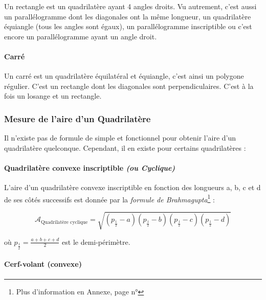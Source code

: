 \documentclass[a4paper, twoside]{article}
\begin{document}
Un rectangle est un quadrilatère ayant 4 angles droits.
Vu autrement, c'est aussi un parallélogramme dont les diagonales ont la même longueur,
un quadrilatère équiangle (tous les angles sont égaux),
un parallélogramme inscriptible ou
c'est encore un parallélogramme ayant un angle droit.

\vspace*{-0.25cm}

\paragraph*{Carré}

Un carré est un quadrilatère équilatéral et équiangle, c'est ainsi un polygone régulier.
C'est un rectangle dont les diagonales sont perpendiculaires.
C'est à la fois un losange et un rectangle.

\subsubsection{Mesure de l'aire d'un Quadrilatère}

Il n'existe pas de formule de simple et fonctionnel pour obtenir l'aire
d'un quadrilatère quelconque. Cependant, il en existe pour certains quadrilatères :

\vspace*{-0.25cm}

\paragraph*{Quadrilatère convexe inscriptible \textit{(ou Cyclique)}}

L'aire d'un quadrilatère convexe inscriptible en fonction des longueurs a, b, c et d de ses
côtés successifs est donnée par la \emph{formule de Brahmagupta}\footnote{Plus d'information en Annexe, page n°\pageref*{formule_de_Brahmagupta}} :

$$ \mathcal{A}_{\text{Quadrilatère cyclique}} = \sqrt{(p_{\frac{1}{2}}-a)(p_{\frac{1}{2}}-b)(p_{\frac{1}{2}}-c)(p_{\frac{1}{2}}-d)} $$

où $p_{\frac{1}{2}} = \frac{a + b + c + d}{2}$ est le demi-périmètre.

\vspace*{-0.25cm}

\paragraph*{Cerf-volant (convexe)}
\end{document}
